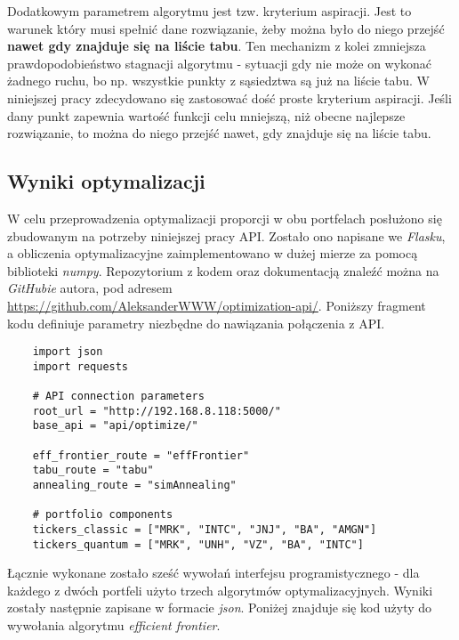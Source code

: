 \documentclass[12pt,a4paper,twoside,openany]{book}
\begin{document}
Dodatkowym parametrem algorytmu jest tzw. kryterium aspiracji.
Jest to warunek który musi spełnić dane rozwiązanie, żeby można było do niego przejść \textbf{nawet gdy znajduje się na liście tabu}.
Ten mechanizm z kolei zmniejsza prawdopodobieństwo stagnacji algorytmu - sytuacji gdy nie może on wykonać żadnego ruchu, bo np. wszystkie punkty z sąsiedztwa są już na liście tabu.
W niniejszej pracy zdecydowano się zastosować dość proste kryterium aspiracji.
Jeśli dany punkt zapewnia wartość funkcji celu mniejszą, niż obecne najlepsze rozwiązanie, to można do niego przejść nawet, gdy znajduje się na liście tabu.


\subsection{Wyniki optymalizacji}

W celu przeprowadzenia optymalizacji proporcji w obu portfelach posłużono się zbudowanym na potrzeby niniejszej pracy API.
Zostało ono napisane we \textit{Flasku}, a obliczenia optymalizacyjne zaimplementowano w dużej mierze za pomocą biblioteki \textit{numpy}.
Repozytorium z kodem oraz dokumentacją znaleźć można na \textit{GitHubie} autora, pod adresem \url{https://github.com/AleksanderWWW/optimization-api/}.
Poniższy fragment kodu definiuje parametry niezbędne do nawiązania połączenia z API.

\begin{verbatim}
    import json
    import requests
    
    # API connection parameters
    root_url = "http://192.168.8.118:5000/"
    base_api = "api/optimize/"
    
    eff_frontier_route = "effFrontier"
    tabu_route = "tabu"
    annealing_route = "simAnnealing"
    
    # portfolio components
    tickers_classic = ["MRK", "INTC", "JNJ", "BA", "AMGN"]
    tickers_quantum = ["MRK", "UNH", "VZ", "BA", "INTC"]
\end{verbatim}

Łącznie wykonane zostało sześć wywołań interfejsu programistycznego - dla każdego z dwóch portfeli użyto trzech algorytmów optymalizacyjnych.
Wyniki zostały następnie zapisane w formacie \textit{json}.
Poniżej znajduje się kod użyty do wywołania algorytmu \textit{efficient frontier}.
\end{document}

